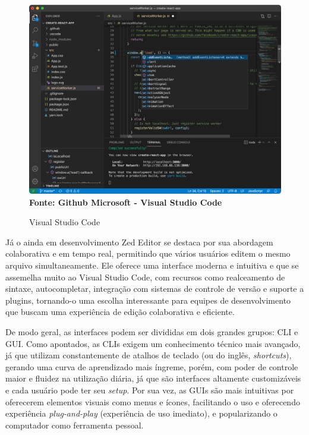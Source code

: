 \FloatBarrier

\begin{figure}[!htbp]
    \centering
    \caption{Visual Studio Code}
    \includegraphics[scale=0.3]{imagens/VSCode}
    \\\textbf{Fonte: Github Microsoft - Visual Studio Code} \label{fig:VSCode}
\end{figure}
\FloatBarrier

Já o ainda em desenvolvimento Zed Editor se destaca por sua abordagem
colaborativa e em tempo real, permitindo que vários usuários editem o mesmo arquivo
simultaneamente. Ele oferece uma interface moderna e intuitiva e que se
assemelha muito ao Visual Studio Code, com recursos como realceamento de sintaxe,
autocompletar, integração com sistemas de controle de versão e suporte a plugins,
tornando-o uma escolha interessante para equipes de desenvolvimento que buscam
uma experiência de edição colaborativa e eficiente.

De modo geral, as interfaces podem ser divididas em dois grandes grupos: CLI e
GUI. Como apontados, as CLIs exigem um conhecimento técnico mais avançado, já que
utilizam constantemente de atalhos de teclado (ou do inglês, \textit{shortcuts}),
gerando uma curva de aprendizado mais íngreme, porém, com poder de controle
maior e fluidez na utilização diária, já que são interfaces altamente customizáveis
e cada usuário pode ter seu \textit{setup}. Por sua vez, as GUIs são mais
intuitivas por oferecerem elementos visuais como menus e ícones, facilitando o uso
e oferecendo experiência \textit{plug-and-play} (experiência de uso imediato), e
popularizando o computador como ferramenta pessoal.

